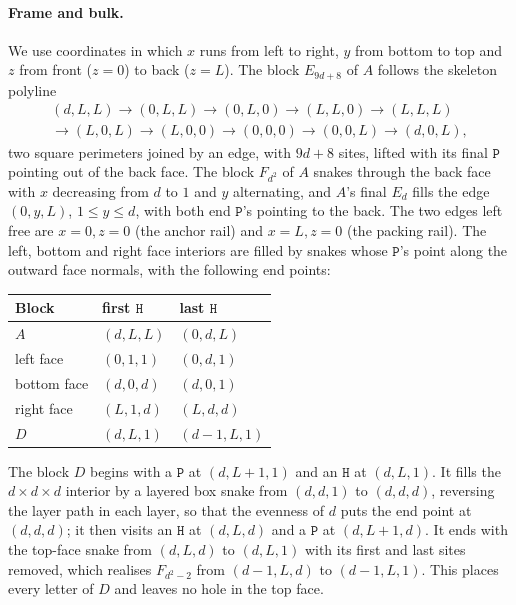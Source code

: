 \documentclass[11pt,letterpaper]{article}
\theoremstyle{definition}
\theoremstyle{remark}
\newcommand{\Hh}{\mathtt{H}}
\newcommand{\Pp}{\mathtt{P}}
\begin{document}
\paragraph{Frame and bulk.}
We use coordinates in which $x$ runs from left to right, $y$ from bottom to top and $z$ from front
($z=0$) to back ($z=L$). The block $E_{9d+8}$ of $A$ follows the skeleton polyline
\begin{multline*}
(d,L,L)\to(0,L,L)\to(0,L,0)\to(L,L,0)\to(L,L,L)\\
\to(L,0,L)\to(L,0,0)\to(0,0,0)\to(0,0,L)\to(d,0,L),
\end{multline*}
two square perimeters joined by an edge, with $9d+8$ sites, lifted with its final $\Pp$ pointing out of
the back face. The block $F_{d^2}$ of $A$ snakes through the back face with $x$ decreasing from $d$ to
$1$ and $y$ alternating, and $A$'s final $E_d$ fills the edge $(0,y,L)$, $1\le y\le d$, with both end
$\Pp$'s pointing to the back. The two edges left free are $x=0,z=0$ (the anchor rail) and $x=L,z=0$ (the
packing rail). The left, bottom and right face interiors are filled by snakes whose $\Pp$'s point
along the outward face normals, with the following end points:
\begin{center}\small
\begin{tabular}{@{}lll@{}}
\toprule
Block & first $\Hh$ & last $\Hh$\\
\midrule
$A$ & $(d,L,L)$ & $(0,d,L)$\\
left face & $(0,1,1)$ & $(0,d,1)$\\
bottom face & $(d,0,d)$ & $(d,0,1)$\\
right face & $(L,1,d)$ & $(L,d,d)$\\
$D$ & $(d,L,1)$ & $(d-1,L,1)$\\
\bottomrule
\end{tabular}
\end{center}
The block $D$ begins with a $\Pp$ at $(d,L+1,1)$ and an $\Hh$ at $(d,L,1)$. It fills the
$d\times d\times d$ interior by a layered box snake from $(d,d,1)$ to $(d,d,d)$, reversing the layer
path in each layer, so that the evenness of $d$ puts the end point at $(d,d,d)$; it then visits an
$\Hh$ at $(d,L,d)$ and a $\Pp$ at $(d,L+1,d)$. It ends with the top-face snake from $(d,L,d)$ to
$(d,L,1)$ with its first and last sites removed, which realises $F_{d^2-2}$ from $(d-1,L,d)$ to
$(d-1,L,1)$. This places every letter of $D$ and leaves no hole in the top face.
\end{document}
